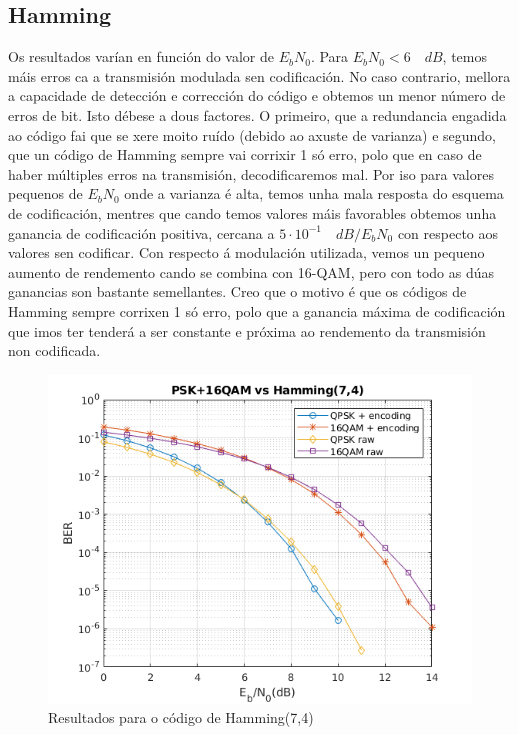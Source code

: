 \documentclass[
	10pt, %
	spanish, %
]{fphw}
\begin{document}
\subsection*{Hamming}
Os resultados varían en función do valor de $E_b N_0$. Para $E_b N_0 < 6 \quad dB$, temos máis erros ca a transmisión modulada sen codificación. No caso contrario, mellora a capacidade de detección e corrección do código e obtemos
un menor número de erros de bit. Isto débese a dous factores. O primeiro, que a redundancia engadida ao código fai que se xere moito ruído (debido ao axuste de varianza) e segundo, que un código de Hamming sempre vai corrixir 1 só erro, polo que en caso de haber múltiples erros na transmisión, decodificaremos mal. Por iso para valores pequenos de $E_b N_0$ onde a varianza é alta, temos unha mala resposta do esquema de codificación, mentres que cando temos valores máis favorables obtemos unha ganancia de codificación positiva, cercana a $ 5 \cdot 10^{-1} \quad dB/E_bN_0$ con respecto aos valores sen codificar.
Con respecto á modulación utilizada, vemos un pequeno aumento de rendemento cando se combina con 16-QAM, pero con todo as dúas ganancias son bastante semellantes. Creo que o motivo é que os códigos de Hamming sempre corrixen 1 só erro, polo que a ganancia máxima de codificación que imos ter tenderá a ser constante e próxima ao rendemento da transmisión non codificada.
\begin{figure}[htb]
\centering
\includegraphics{hamming.png}
\caption{Resultados para o código de Hamming(7,4)}
\end{figure}
\end{document}
